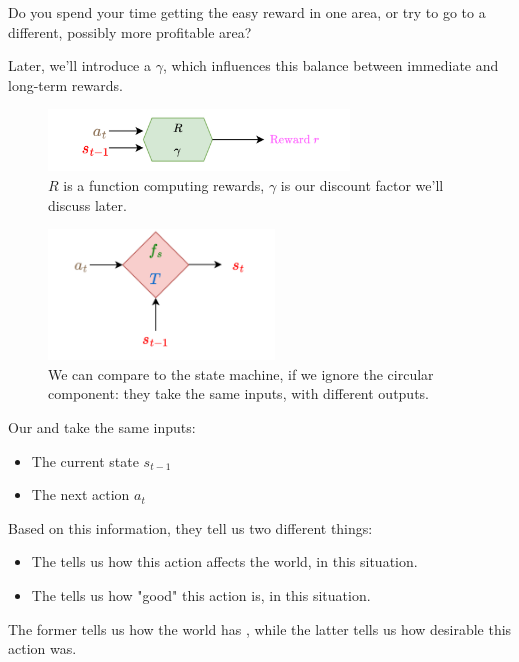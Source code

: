         \miniex Do you spend your time getting the easy reward in one area, or try to go to a different, possibly more profitable area?

        Later, we'll introduce a  $\gamma$, which influences this balance between immediate and long-term rewards.

        \begin{figure}[H]
            \centering
            \includegraphics[width=80mm,scale=0.5]{images/mdp_images/reward_function.png}
            
            \caption*{$R$ is a function computing rewards, $\gamma$ is our discount factor we'll discuss later.}
        \end{figure}

        \begin{figure}[H]
            \centering
            \includegraphics[width=60mm,scale=0.5]{images/mdp_images/state_machine_noloop.png}
            
            \caption*{We can compare to the state machine, if we ignore the circular component: they take the same inputs, with different outputs.}
        \end{figure}

        \begin{concept}
            Our  and  take the same inputs:

            \begin{itemize}
                \item The current state $s_{t-1}$
                \item The next action $a_t$
            \end{itemize}

            Based on this information, they tell us two different things:

            \begin{itemize}
                \item The  tells us how this action affects the world, in this situation.
                \item The  tells us how "good" this action is, in this situation.
                
            \end{itemize}

            The former tells us how the world has , while the latter tells us how  desirable this action was.
        \end{concept}


